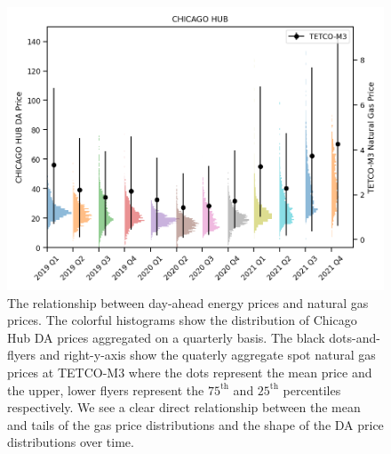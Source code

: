 \begin{figure}[htbp]
    \caption[Relationship between quarterly aggregated day-ahead prices and natural gas prices]{
        The relationship between day-ahead energy prices and natural gas prices.
        The colorful histograms show the distribution of Chicago Hub DA prices aggregated
        on a quarterly basis.
        The black dots-and-flyers and right-y-axis show the quaterly aggregate spot natural gas prices at TETCO-M3
        where the dots represent the mean price and the upper, lower flyers represent the $75^{\text{th}}$ and
        $25^{\text{th}}$ percentiles respectively.
        We see a clear direct relationship between the mean and tails of the gas price distributions and the shape
        of the DA price distributions over time.
    }
    \begin{center}
        \setlength{\fboxsep}{0pt}%
        \setlength{\fboxrule}{1pt}%
        \includegraphics[width=120mm]{figs/chicago_hub_tetco_dists}
    \end{center}
    \label{fig:price_gas_hist}
\end{figure}

